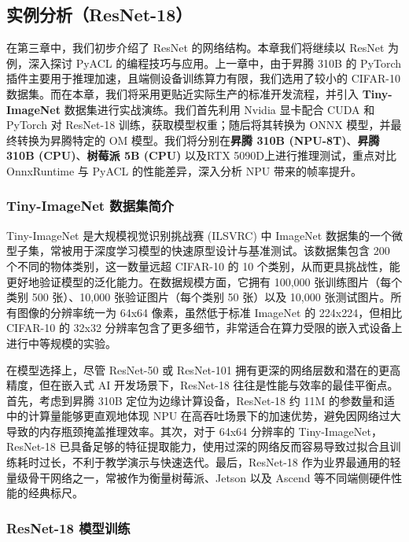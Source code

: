 \subsection{实例分析（ResNet-18）}\label{src-book-chapter4-h24}

在第三章中，我们初步介绍了 ResNet 的网络结构。本章我们将继续以 ResNet
为例，深入探讨 PyACL 的编程技巧与应用。上一章中，由于昇腾 310B 的
PyTorch 插件主要用于推理加速，且端侧设备训练算力有限，我们选用了较小的
CIFAR-10
数据集。而在本章，我们将采用更贴近实际生产的标准开发流程，并引入
\textbf{Tiny-ImageNet} 数据集进行实战演练。我们首先利用 Nvidia 显卡配合
CUDA 和 PyTorch 对 ResNet-18 训练，获取模型权重；随后将其转换为 ONNX
模型，并最终转换为昇腾特定的 OM 模型。我们将分别在\textbf{昇腾 310B
(NPU-8T)}、\textbf{昇腾 310B (CPU)}、\textbf{树莓派 5B (CPU)} 以及RTX
5090D上进行推理测试，重点对比 OnnxRuntime 与 PyACL 的性能差异，深入分析
NPU 带来的帧率提升。

\subsubsection{Tiny-ImageNet 数据集简介}\label{src-book-chapter4-h25}

Tiny-ImageNet 是大规模视觉识别挑战赛 (ILSVRC) 中 ImageNet
数据集的一个微型子集，常被用于深度学习模型的快速原型设计与基准测试。该数据集包含
200 个不同的物体类别，这一数量远超 CIFAR-10 的 10
个类别，从而更具挑战性，能更好地验证模型的泛化能力。在数据规模方面，它拥有
100,000 张训练图片（每个类别 500 张）、10,000 张验证图片（每个类别 50
张）以及 10,000 张测试图片。所有图像的分辨率统一为 64x64
像素，虽然低于标准 ImageNet 的 224x224，但相比 CIFAR-10 的 32x32
分辨率包含了更多细节，非常适合在算力受限的嵌入式设备上进行中等规模的实验。

在模型选择上，尽管 ResNet-50 或 ResNet-101
拥有更深的网络层数和潜在的更高精度，但在嵌入式 AI 开发场景下，ResNet-18
往往是性能与效率的最佳平衡点。首先，考虑到昇腾 310B
定位为边缘计算设备，ResNet-18 约 11M
的参数量和适中的计算量能够更直观地体现 NPU
在高吞吐场景下的加速优势，避免因网络过大导致的内存瓶颈掩盖推理效率。其次，对于
64x64 分辨率的 Tiny-ImageNet，ResNet-18
已具备足够的特征提取能力，使用过深的网络反而容易导致过拟合且训练耗时过长，不利于教学演示与快速迭代。最后，ResNet-18
作为业界最通用的轻量级骨干网络之一，常被作为衡量树莓派、Jetson 以及
Ascend 等不同端侧硬件性能的经典标尺。

\subsubsection{ResNet-18 模型训练}\label{src-book-chapter4-h26}

